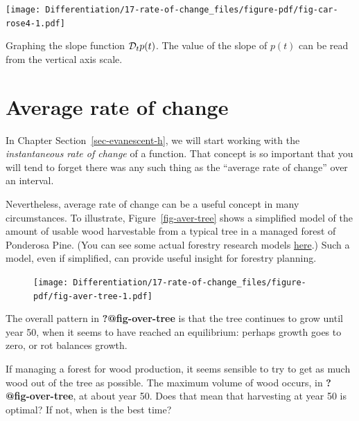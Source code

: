 \documentclass[
  letterpaper,
  DIV=11,
  numbers=noendperiod,
  oneside]{scrreprt}
\begin{document}
\begin{marginfigure}

{\centering \texttt{[image: Differentiation/17-rate-of-change\_files/figure-pdf/fig-car-rose4-1.pdf]}

}

\caption{\label{fig-car-rose4}Graphing the slope function
\({\cal D}_t p(t)\). The value of the slope of \(p(t)\) can be read from
the vertical axis scale.}

\end{marginfigure}

\hypertarget{sec-tree-harvest-example}{%
\section{Average rate of change}\label{sec-tree-harvest-example}}

In Chapter Section~\ref{sec-evanescent-h}, we will start working with
the \emph{instantaneous rate of change} of a function. That concept is
so important that you will tend to forget there was any such thing as
the ``average rate of change'' over an interval.

Nevertheless, average rate of change can be a useful concept in many
circumstances. To illustrate, Figure~\ref{fig-aver-tree} shows a
simplified model of the amount of usable wood harvestable from a typical
tree in a managed forest of Ponderosa Pine. (You can see some actual
forestry research models
\href{https://www.fs.fed.us/rm/pubs/rmrs_gtr292/1992_milner.pdf}{here}.)
Such a model, even if simplified, can provide useful insight for
forestry planning.

\begin{figure}


{\centering \texttt{[image: Differentiation/17-rate-of-change\_files/figure-pdf/fig-aver-tree-1.pdf]}

}

\end{figure}

The overall pattern in \textbf{?@fig-over-tree} is that the tree
continues to grow until year 50, when it seems to have reached an
equilibrium: perhaps growth goes to zero, or rot balances growth.

If managing a forest for wood production, it seems sensible to try to
get as much wood out of the tree as possible. The maximum volume of wood
occurs, in \textbf{?@fig-over-tree}, at about year 50. Does that mean
that harvesting at year 50 is optimal? If not, when is the best time?
{}
\end{document}

